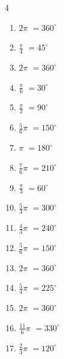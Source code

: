 \begin{multicols}{4}
\begin{enumerate}
  \item $\displaystyle 2\pi$
        $\displaystyle =360^{\circ}$

  \item $\displaystyle \frac{\pi}{4}$
        $\displaystyle =45^{\circ}$

  \item $\displaystyle 2\pi$
        $\displaystyle =360^{\circ}$

  \item $\displaystyle \frac{\pi}{6}$
        $\displaystyle =30^{\circ}$

  \item $\displaystyle \frac{\pi}{2}$
        $\displaystyle =90^{\circ}$

\columnbreak %

  \item $\displaystyle \frac{5}{6}\pi$
        $\displaystyle =150^{\circ}$

  \item $\displaystyle \pi$
        $\displaystyle =180^{\circ}$

  \item $\displaystyle \frac{7}{6}\pi$
        $\displaystyle =210^{\circ}$

  \item $\displaystyle \frac{\pi}{3}$
        $\displaystyle =60^{\circ}$

  \item $\displaystyle \frac{5}{3}\pi$
        $\displaystyle =300^{\circ}$

  \item $\displaystyle \frac{4}{3}\pi$
        $\displaystyle =240^{\circ}$

  \item $\displaystyle \frac{5}{6}\pi$
        $\displaystyle =150^{\circ}$

  \item $\displaystyle 2\pi$
        $\displaystyle =360^{\circ}$

  \item $\displaystyle \frac{5}{4}\pi$
        $\displaystyle =225^{\circ}$

  \item $\displaystyle 2\pi$
        $\displaystyle =360^{\circ}$

  \item $\displaystyle \frac{11}{6}\pi$
        $\displaystyle =330^{\circ}$

  \item $\displaystyle \frac{2}{3}\pi$
        $\displaystyle =120^{\circ}$


\end{enumerate}
\end{multicols}
